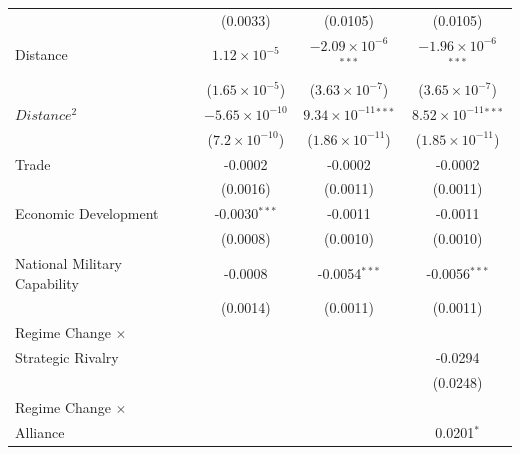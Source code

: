 \documentclass[12pt,a4paper]{article}
\begin{document}
\begin{table}[hptb]
\begin{tabular}{lcccc}
                                         &                & (0.0033)                & (0.0105)                       & (0.0105)\\   
   Distance                               &                & $1.12\times 10^{-5}$    & $-2.09\times 10^{-6}$$^{***}$  & $-1.96\times 10^{-6}$$^{***}$\\    
                                         &                & ($1.65\times 10^{-5}$)  & ($3.63\times 10^{-7}$)         & ($3.65\times 10^{-7}$)\\    
   $Distance^2$                        &                & $-5.65\times 10^{-10}$  & $9.34\times 10^{-11}$$^{***}$  & $8.52\times 10^{-11}$$^{***}$\\    
                                         &                & ($7.2\times 10^{-10}$)  & ($1.86\times 10^{-11}$)        & ($1.85\times 10^{-11}$)\\    
   Trade                            &                & -0.0002                 & -0.0002                        & -0.0002\\   
                                         &                & (0.0016)                & (0.0011)                       & (0.0011)\\   
   Economic Development                            &                & -0.0030$^{***}$         & -0.0011                        & -0.0011\\   
                                         &                & (0.0008)                & (0.0010)                       & (0.0010)\\   
   National Military Capability                              &                & -0.0008                 & -0.0054$^{***}$                & -0.0056$^{***}$\\   
                                         &                & (0.0014)                & (0.0011)                       & (0.0011)\\   
   Regime Change $\times$ \\Strategic Rivalry   &                &                         &                                & -0.0294\\   
                                         &                &                         &                                & (0.0248)\\   
   Regime Change $\times$ \\Alliance         &                &                         &                                & 0.0201$^{*}$\\   

\end{tabular}
\end{table}
\end{document}

